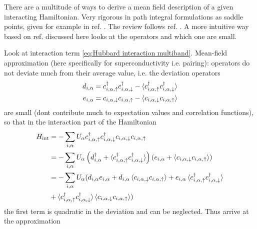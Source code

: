 \documentclass[../notes.tex]{subfiles}
\begin{document}
There are a multitude of ways to derive a mean field description of a given interacting Hamiltonian.
Very rigorous in path integral formulations as saddle points, given for example in ref. \cite{colemanIntroductionManyBodyPhysics2015}.
The review follows ref. \cite{huhtinenSuperconductivityNormalState2023}.
A more intuitive way based on ref. \cite{bruusManyBodyQuantumTheory2004} discussed here looks at the operators and which one are small. 

Look at interaction term \cref{eq:Hubbard interaction multiband}.
Mean-field approximation (here specifically for superconductivity i.e. pairing): operators do not deviate much from their average value, i.e. the deviation operators 
\begin{align}
	d_{i, \alpha} = c_{i, \alpha, \uparrow}^{\dagger} c_{i, \alpha, \downarrow}^{\dagger} - \braket{c_{i, \alpha, \uparrow}^{\dagger} c_{i, \alpha, \downarrow}^{\dagger}} \\
	e_{i, \alpha} = c_{i, \alpha, \downarrow} c_{i, \alpha, \uparrow} - \braket{c_{i, \alpha, \downarrow} c_{i, \alpha, \uparrow}}
\end{align}
are small (dont contribute much to expectation values and correlation functions), so that in the interaction part of the Hamiltonian
\begin{align}
	H_{\mathrm{int}} &= -\sum_{i, \alpha} U_{\alpha} c_{i, \alpha, \uparrow}^{\dagger} c_{i, \alpha, \downarrow}^{\dagger} c_{i, \alpha, \downarrow} c_{i, \alpha, \uparrow} \\
	&= -\sum_{i, \alpha} U_{\alpha} 
	\left( d_{i, \alpha}^{\dagger} + \braket{c_{i, \alpha, \uparrow}^{\dagger} c_{i, \alpha, \downarrow}^{\dagger}} \right)
	\left( e_{i, \alpha} + \braket{c_{i, \alpha, \downarrow} c_{i, \alpha, \uparrow}} \right) \\
	&= -\sum_{i, \alpha} U_{\alpha} (
		d_{i, \alpha} e_{i, \alpha}
		+ d_{i, \alpha} \braket{c_{i, \alpha, \downarrow} c_{i, \alpha, \uparrow}}
		+ e_{i, \alpha} \braket{c_{i, \alpha, \uparrow}^{\dagger} c_{i, \alpha, \downarrow}^{\dagger}} \\
		&+ \braket{c_{i, \alpha, \uparrow}^{\dagger} c_{i, \alpha, \downarrow}^{\dagger}} \braket{c_{i, \alpha, \downarrow} c_{i, \alpha, \uparrow}} )
\end{align}
the first term is quadratic in the deviation and can be neglected.
Thus arrive at the approximation
\end{document}
